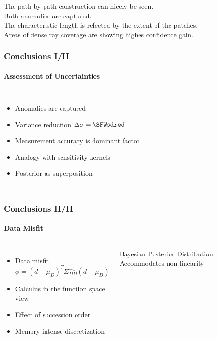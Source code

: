 \documentclass[aspectratio=169, t, 10pt,
    ignorenonframetext,
    ]{beamer}
\begin{document}
The path by path construction can nicely be seen.
\\
Both anomalies are captured.
\\
The characteristic length is refected by the extent of the patches.
\\
Areas of dense ray coverage are showing highes confidence gain.


\begin{frame}
    \frametitle{Conclusions \phantom{I}I/II}
    \framesubtitle{Assessment of Uncertainties}

\begin{columns}
%

    \begin{itemize}
        \item Anomalies are captured
        \item Variance reduction $\Delta\sigma = \SFWsdred$
        \item Measurement accuracy is dominant factor
        \item Analogy with sensitivity kernels
        \item Posterior as superposition
    \end{itemize}

    \vspace{-10mm}

\end{columns}

\end{frame}


\begin{frame}
    \frametitle{Conclusions II/II}
    \framesubtitle{Data Misfit }

\begin{columns}
%
    \begin{itemize}
        \item Data misfit
            \begin{equation}
                \phi = (d-\mu_D)^T \Sigma_{DD}^{-1} (d-\mu_D)
            \end{equation}
        \item Calculus in the function space view
        \item Effect of succession order
        \item Memory intense discretization
    \end{itemize}

    \begin{exampleblock}{Bayesian Posterior Distribution}
        Accommodates non-linearity
    \end{exampleblock}

    \vspace{-10mm}
    
\end{columns}

\end{frame}
\end{document}
